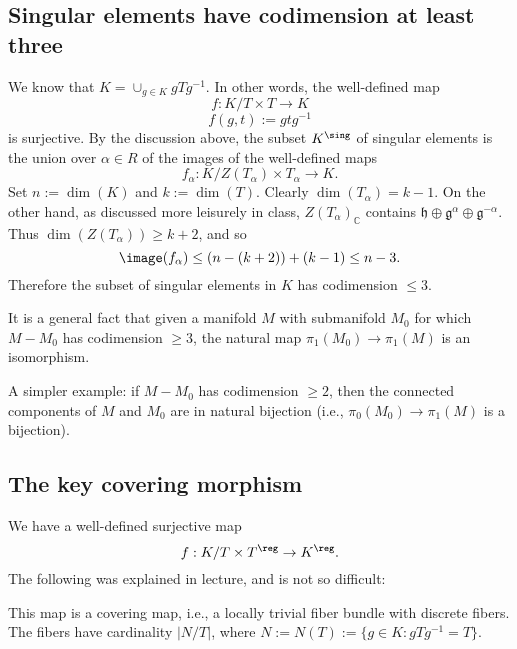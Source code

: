 \documentclass[reqno]{amsart} 
\begin{document}
\subsection{Singular elements have codimension at least three}
\label{sec:org776dd5b}
We know that $K = \cup_{g \in K} g T g^{-1}$.  In other words, the well-defined map
\begin{equation*}
  f : K / T \times T \rightarrow K
\end{equation*}
\begin{equation*}
  f(g,t) := g t g^{-1}
\end{equation*}
is surjective.  By the discussion above, the subset $K^{\sing}$ of singular elements is the union over $\alpha \in R$ of the images of the well-defined maps
\begin{equation*}
  f_\alpha : K / Z(T_\alpha) \times T_\alpha \rightarrow K.
\end{equation*}
Set $n := \dim(K)$ and $k := \dim(T)$.  Clearly $\dim(T_\alpha) = k - 1$.  On the other hand, as discussed more leisurely in class, $Z(T_\alpha)_\mathbb{C}$ contains $\mathfrak{h} \oplus \mathfrak{g}^\alpha \oplus \mathfrak{g}^{-\alpha}$.  Thus $\dim(Z(T_\alpha)) \geq k+ 2$, and so
\begin{equation*}
  \image(f_\alpha) \leq (n - (k+2)) + (k-1) \leq n - 3.
\end{equation*}
Therefore the subset of singular elements in $K$ has codimension $\leq 3$.

It is a general fact that given a manifold $M$ with submanifold $M_0$ for which $M - M_0$ has codimension $\geq 3$, the natural map $\pi_1(M_0) \rightarrow \pi_1(M)$ is an isomorphism.

A simpler example: if $M - M_0$ has codimension $\geq 2$, then the connected components of $M$ and $M_0$ are in natural bijection (i.e., $\pi_0(M_0) \rightarrow \pi_1(M)$ is a bijection).

\subsection{The key covering morphism\label{sec:key-cov-morph}}
\label{sec:org8a0ef0a}
We have a well-defined surjective map
\begin{equation*}
  f : K/T \times T^{\reg} \rightarrow K^{\reg}.
\end{equation*}
The following was explained in lecture, and is not so difficult:
\begin{lemma}
  This map is a covering map, i.e., a locally trivial fiber bundle with discrete fibers.  The fibers have cardinality $|N/T|$, where $N := N(T) := \{g \in K : g T g^{-1} = T\}$.
\end{lemma}
\end{document}
